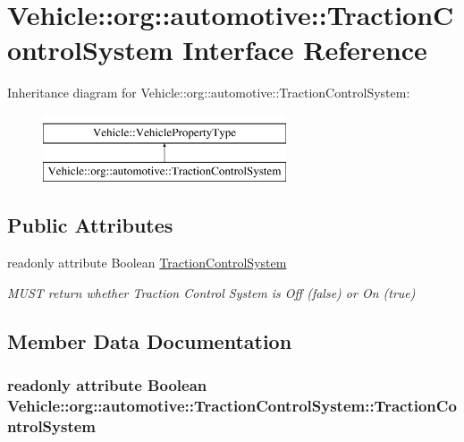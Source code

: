 \hypertarget{interfaceVehicle_1_1org_1_1automotive_1_1TractionControlSystem}{\section{Vehicle\-:\-:org\-:\-:automotive\-:\-:Traction\-Control\-System Interface Reference}
\label{interfaceVehicle_1_1org_1_1automotive_1_1TractionControlSystem}
}
Inheritance diagram for Vehicle\-:\-:org\-:\-:automotive\-:\-:Traction\-Control\-System\-:\begin{figure}[H]
\begin{center}
\leavevmode
\includegraphics[height=2.000000cm]{interfaceVehicle_1_1org_1_1automotive_1_1TractionControlSystem}
\end{center}
\end{figure}
\subsection*{Public Attributes}
\begin{DoxyCompactItemize}
\item 
readonly attribute Boolean \hyperlink{interfaceVehicle_1_1org_1_1automotive_1_1TractionControlSystem_a595abf804b6571c5951fa66919630760}{Traction\-Control\-System}
\begin{DoxyCompactList}\small\item\em M\-U\-S\-T return whether Traction Control System is Off (false) or On (true) \end{DoxyCompactList}\end{DoxyCompactItemize}


\subsection{Member Data Documentation}
\hypertarget{interfaceVehicle_1_1org_1_1automotive_1_1TractionControlSystem_a595abf804b6571c5951fa66919630760}{
\subsubsection[{Traction\-Control\-System}]{\setlength{\rightskip}{0pt plus 5cm}readonly attribute Boolean Vehicle\-::org\-::automotive\-::\-Traction\-Control\-System\-::\-Traction\-Control\-System}}\label{interfaceVehicle_1_1org_1_1automotive_1_1TractionControlSystem_a595abf804b6571c5951fa66919630760}


